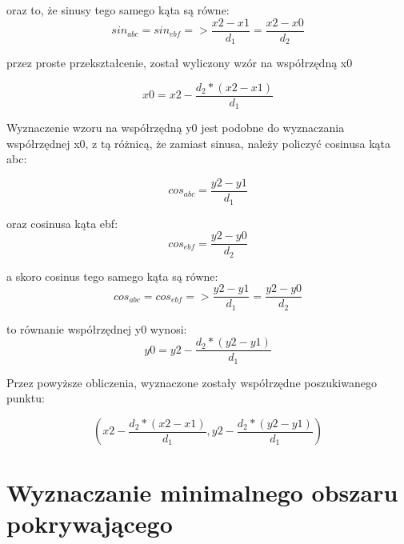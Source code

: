 oraz to, że sinusy tego samego kąta są równe:
\begin{equation}
sin_{abc} = sin_{ebf} => \frac{x2 - x1}{d_1} = \frac{x2 - x0}{d_2}
\end{equation}\newline

przez proste przekształcenie, został wyliczony wzór na współrzędną x0

\begin{equation}
x0 = x2 - \frac{d_2*(x2 - x1)}{d_1}
\end{equation}\newline

Wyznaczenie wzoru na współrzędną y0 jest podobne do wyznaczania współrzędnej x0, z tą różnicą, że zamiast sinusa, należy policzyć cosinusa kąta abc:

\begin{equation}
cos_{abc} = \frac{y2 - y1}{d_1}
\end{equation}\newline

oraz cosinusa kąta ebf:
\begin{equation}
cos_{ebf} = \frac{y2 - y0}{d_2}
\end{equation}\newline

a skoro cosinus tego samego kąta są równe:
\begin{equation}
cos_{abc} = cos_{ebf} => \frac{y2 - y1}{d_1} = \frac{y2 - y0}{d_2}
\end{equation}\newline

to równanie współrzędnej y0 wynosi:
\begin{equation}
y0 = y2 - \frac{d_2*(y2 - y1)}{d_1}
\end{equation}\newline

Przez powyższe obliczenia, wyznaczone zostały współrzędne poszukiwanego punktu:

\begin{equation} \label{eq:calculatedCoordinates}
(x2 - \frac{d_2*(x2 - x1)}{d_1}, y2 - \frac{d_2*(y2 - y1)}{d_1})
\end{equation}\newline

\newpage
\section{Wyznaczanie minimalnego obszaru pokrywającego}
\label{sec:Wyznaczanieminimalnegoobszarupokrywającego}

